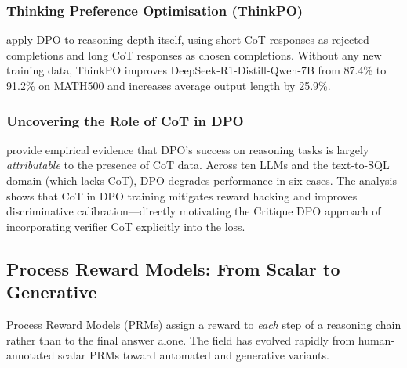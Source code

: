 \subsubsection{Thinking Preference Optimisation (ThinkPO)}

\autocite{yang2025thinkingpreferenceoptimization} apply DPO to
reasoning depth itself, using short CoT responses as rejected
completions and long CoT responses as chosen completions.  Without
any new training data, ThinkPO improves DeepSeek-R1-Distill-Qwen-7B
from 87.4\% to 91.2\% on MATH500 and increases average output length
by 25.9\%.

\subsubsection{Uncovering the Role of CoT in DPO}

\autocite{gao2025uncoveringimpactchainofthought} provide empirical
evidence that DPO's success on reasoning tasks is largely
\emph{attributable} to the presence of CoT data.  Across ten LLMs
and the text-to-SQL domain (which lacks CoT), DPO degrades
performance in six cases.  The analysis shows that CoT in DPO
training mitigates reward hacking and improves discriminative
calibration—directly motivating the Critique DPO approach of
incorporating verifier CoT explicitly into the loss.



\subsection{Process Reward Models: From Scalar to Generative}
\label{sec:prm}

Process Reward Models (PRMs) assign a reward to \emph{each} step of
a reasoning chain rather than to the final answer alone.  The field
has evolved rapidly from human-annotated scalar PRMs toward automated
and generative variants.

